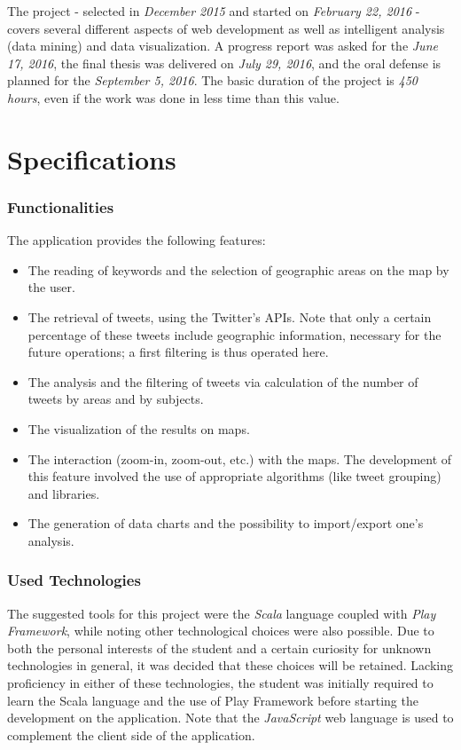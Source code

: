 \documentclass[a4paper,11pt]{report}
\begin{document}
The project - selected in \emph{December 2015} and started on \emph{February 22, 2016} - covers several different aspects of web development as well as intelligent analysis (data mining) and data visualization. A progress report was asked for the \emph{June 17, 2016}, the final thesis was delivered on \emph{July 29, 2016}, and the oral defense is planned for the \emph{September 5, 2016}. The basic duration of the project is \emph{450 hours}, even if the work was done in less time than this value.
\bigskip

\section{Specifications}
\subsubsection{Functionalities}
The application provides the following features:
\begin{itemize}
	\item The reading of keywords and the selection of geographic areas on the map by the user.
	\item The retrieval of tweets, using the Twitter's APIs.
		Note that only a certain percentage of these tweets include geographic information, necessary for the future operations; a first filtering is thus operated here.
	\item The analysis and the filtering of tweets via calculation of the number of tweets by areas and by subjects.
	\item The visualization of the results on maps.
	\item The interaction (zoom-in, zoom-out, etc.) with the maps. The development of this feature involved the use of appropriate algorithms (like tweet grouping) and libraries.
	\item The generation of data charts and the possibility to import/export one's analysis.
\end{itemize}
\bigskip

\subsubsection{Used Technologies}
The suggested tools for this project were the \emph{Scala} language coupled with \emph{Play Framework}, while noting other technological choices were also possible. Due to both the personal interests of the student and a certain curiosity for unknown technologies in general, it was decided that these choices will be retained.
Lacking proficiency in either of these technologies, the student was initially required to learn the Scala language and the use of Play Framework before starting the development on the application.
Note that the \emph{JavaScript} web language is used to complement the client side of the application.
\end{document}
